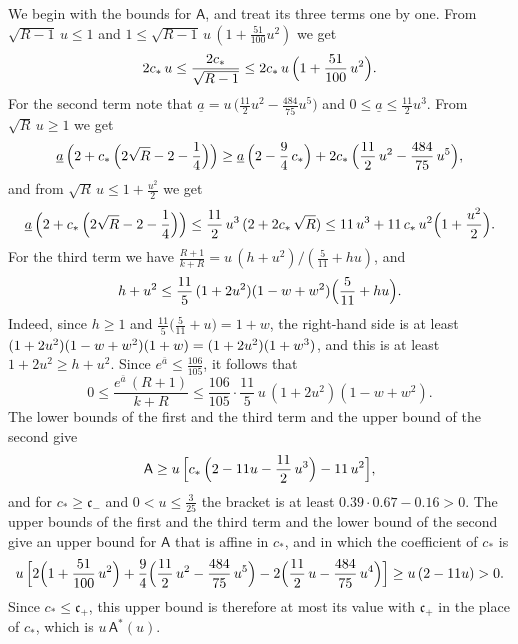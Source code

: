 \documentclass{amsart}
\theoremstyle{definition}
\theoremstyle{remark}
\numberwithin{equation}{section}
\begin{document}
We begin with the bounds for $\mathsf{A}$, and treat its three terms one by one. From $\sqrt{R-1}\,u\le 1$ and $1\le\sqrt{R-1}\,u\,(1+\frac{51}{100}u^2)$ we get
\[
2c_\ast\,u\le\frac{2c_\ast}{\sqrt{R-1}}\le 2c_\ast\,u\,\Bigl(1+\frac{51}{100}\,u^2\Bigr).
\]
For the second term note that $\underline a=u\,\bigl(\frac{11}{2}u^2-\frac{484}{75}u^5\bigr)$ and $0\le\underline a\le\frac{11}{2}u^3$. From $\sqrt R\,u\ge 1$ we get
\[
\underline a\,\Bigl(2+c_\ast\,\Bigl(2\sqrt R-2-\frac14\Bigr)\Bigr)\ge\underline a\,\Bigl(2-\frac94\,c_\ast\Bigr)+2c_\ast\,\Bigl(\frac{11}{2}\,u^2-\frac{484}{75}\,u^5\Bigr),
\]
and from $\sqrt R\,u\le 1+\frac{u^2}{2}$ we get
\[
\underline a\,\Bigl(2+c_\ast\,\Bigl(2\sqrt R-2-\frac14\Bigr)\Bigr)\le\frac{11}{2}\,u^3\,(2+2c_\ast\,\sqrt R)\le 11\,u^3+11\,c_\ast\,u^2\Bigl(1+\frac{u^2}{2}\Bigr).
\]
For the third term we have $\frac{R+1}{k+R}=u\,(h+u^2)/(\frac{5}{11}+hu)$, and
\[
h+u^2\le\frac{11}{5}\,(1+2u^2)(1-w+w^2)\Bigl(\frac{5}{11}+hu\Bigr).
\]
Indeed, since $h\ge 1$ and $\frac{11}{5}\bigl(\frac{5}{11}+u\bigr)=1+w$, the right-hand side is at least $(1+\nobreak 2u^2)(1-w+w^2)(1+\nobreak w)=(1+2u^2)(1+w^3)$, and this is at least $1+2u^2\ge h+u^2$. Since $e^{\bar a}\le\frac{106}{105}$, it follows that
\[
0\le\frac{e^{\bar a}\,(R+1)}{k+R}\le\frac{106}{105}\cdot\frac{11}{5}\,u\,(1+2u^2)(1-w+w^2).
\]
The lower bounds of the first and the third term and the upper bound of the second give
\[
\mathsf{A}\ge u\,\Bigl[c_\ast\,\Bigl(2-11u-\frac{11}{2}\,u^3\Bigr)-11\,u^2\Bigr],
\]
and for $c_\ast\ge\mathfrak{c}_-$ and $0<u\le\frac{3}{25}$ the bracket is at least $0.39\cdot 0.67-0.16>0$. The upper bounds of the first and the third term and the lower bound of the second give an upper bound for $\mathsf{A}$ that is affine in $c_\ast$, and in which the coefficient of $c_\ast$ is
\[
u\,\Bigl[2\Bigl(1+\frac{51}{100}\,u^2\Bigr)+\frac94\Bigl(\frac{11}{2}\,u^2-\frac{484}{75}\,u^5\Bigr)-2\Bigl(\frac{11}{2}\,u-\frac{484}{75}\,u^4\Bigr)\Bigr]\ge u\,(2-11u)>0.
\]
Since $c_\ast\le\mathfrak{c}_+$, this upper bound is therefore at most its value with $\mathfrak{c}_+$ in the place of $c_\ast$, which is $u\,\mathsf{A}^{*}(u)$.
\end{document}
